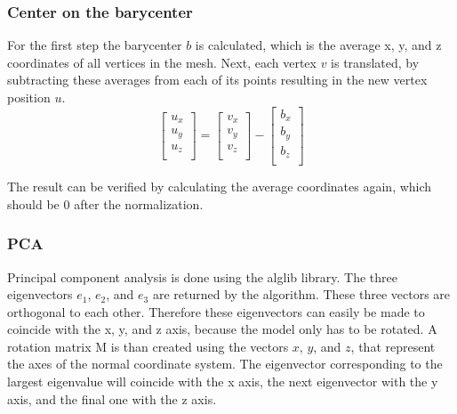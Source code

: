 \documentclass{bigdata}
\begin{document}
\subsubsection{Center on the barycenter}

For the first step the barycenter $b$ is calculated, which is the average x, y, and z coordinates of all vertices in the mesh. Next, each vertex $v$ is translated, by subtracting these averages from each of its points resulting in the new vertex position $u$.
\[
\begin{bmatrix}
u_x \\
u_y \\
u_z \\
\end{bmatrix}
=
\begin{bmatrix}
v_x \\
v_y \\
v_z \\
\end{bmatrix}
-
\begin{bmatrix}
b_x \\
b_y \\
b_z \\
\end{bmatrix}
\]

The result can be verified by calculating the average coordinates again, which should be 0 after the normalization.

\subsubsection{PCA}
Principal component analysis is done using the alglib library. The three eigenvectors $e_1$, $e_2$, and $e_3$ are returned by the algorithm. These three vectors are orthogonal to each other. Therefore these eigenvectors can easily be made to coincide with the x, y, and z axis, because the model only has to be rotated. A rotation matrix M is than created using the vectors $x$, $y$, and $z$, that represent the axes of the normal coordinate system. The eigenvector corresponding to the largest eigenvalue will coincide with the x axis, the next eigenvector with the y axis, and the final one with the z axis.
\end{document}
